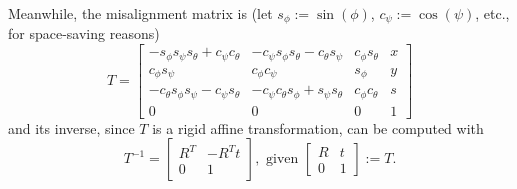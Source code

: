 Meanwhile, the misalignment matrix is (let $s_\phi := \sin(\phi)$, $c_\psi := \cos(\psi)$, etc., for space-saving reasons)
\[
	T = \begin{bmatrix}
		-s_\phi s_\psi s_\theta + c_\psi c_\theta & -c_\psi s_\phi s_\theta - c_\theta s_\psi & c_\phi s_\theta & x \\
		c_\phi s_\psi & c_\phi c_\psi & s_\phi & y \\
		-c_\theta s_\phi s_\psi - c_\psi s_\theta & -c_\psi c_\theta s_\phi + s_\psi s_\theta & c_\phi c_\theta & s \\
		0 & 0 & 0 & 1
	\end{bmatrix}
\]
and its inverse, since $T$ is a rigid affine transformation, can be computed with
\[
	T^{-1} = \begin{bmatrix}
			R^T & -R^T t \\
			0 & 1
		\end{bmatrix}, \text{ given } \begin{bmatrix}
			R & t \\
			0 & 1
		\end{bmatrix} := T.
\]

